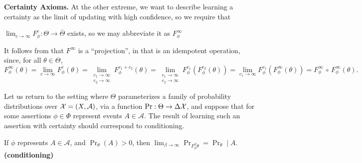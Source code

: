 \documentclass{article}
\begin{document}
\textbf{Certainty Axioms.}
At the other extreme, we want to describe learning a certainty as the limit of updating with high confidence, so we require that
\begin{URaxioms}
    \item
        $\displaystyle\lim_{c \to \infty} F^{c}_\phi : \Theta \to \bar\Theta$
        exists, so we may abbreviate it as $F^\infty_\phi$
        \label{ax:cert-exists}
\end{URaxioms}

It follows from  that
$F^\infty$
is a ``projection'', in that is an idempotent operation, since,
for all $\theta \in \Theta$,
\[ 
    F^\infty_\phi (\theta) 
        = \lim_{c \to \infty} F^{c}_\phi (\theta) 
        = \lim_{\substack{c_1 \to \infty \\ c_2 \to \infty}}
            F^{c_1 + c_2}_\phi (\theta) 
        = \lim_{\substack{c_1 \to \infty \\ c_2 \to \infty}}
            F^{c_1}_\phi ( F^{c_2}_\phi (\theta))
        = \lim_{c_1 \to \infty} F^{c_1}_\phi (F^{\infty}_\phi(\theta)) 
        = F^\infty_\phi \,\circ\, F^\infty_\phi  (\theta)
        .
\]

Let us return to the setting where $\Theta$ parameterizes a family of probability distributions over $\mathcal X = (X, \mathcal A)$, via a function $\Pr : \Theta \to \Delta\mathcal X$,
and suppose that for some assertions $\phi \in \Phi$ represent events $A \in \mathcal A$.
The result of learning such an assertion with certainty should correspond to conditioning.

\begin{URaxioms}
    \item If $\phi$ represents $A \in \mathcal A$, and $\Pr_{\theta}(A) > 0$, then
        $\displaystyle \lim_{\beta\to\infty} \Pr_{ F^\beta_\phi\theta } = \Pr_\theta \mid A$.
        \hfill \textbf{(conditioning)} \label{ax:conditioning}

\end{URaxioms}
\end{document}
